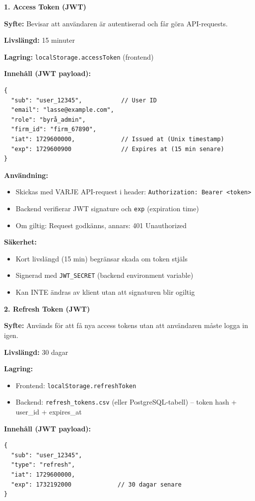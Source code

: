 \documentclass[12pt,a4paper]{article}
\begin{document}
\textbf{1. Access Token (JWT)}

\textbf{Syfte:} Bevisar att användaren är autentiserad och får göra API-requests.

\textbf{Livslängd:} 15 minuter

\textbf{Lagring:} \texttt{localStorage.accessToken} (frontend)

\textbf{Innehåll (JWT payload):}
\begin{verbatim}
{
  "sub": "user_12345",           // User ID
  "email": "lasse@example.com",
  "role": "byrå_admin",
  "firm_id": "firm_67890",
  "iat": 1729600000,             // Issued at (Unix timestamp)
  "exp": 1729600900              // Expires at (15 min senare)
}
\end{verbatim}

\textbf{Användning:}
\begin{itemize}[noitemsep]
  \item Skickas med VARJE API-request i header: \texttt{Authorization: Bearer <token>}
  \item Backend verifierar JWT signature och \texttt{exp} (expiration time)
  \item Om giltig: Request godkänns, annars: 401 Unauthorized
\end{itemize}

\textbf{Säkerhet:}
\begin{itemize}[noitemsep]
  \item Kort livslängd (15 min) begränsar skada om token stjäls
  \item Signerad med \texttt{JWT\_SECRET} (backend environment variable)
  \item Kan INTE ändras av klient utan att signaturen blir ogiltig
\end{itemize}

\textbf{2. Refresh Token (JWT)}

\textbf{Syfte:} Används för att få nya access tokens utan att användaren måste logga in igen.

\textbf{Livslängd:} 30 dagar

\textbf{Lagring:}
\begin{itemize}[noitemsep]
  \item Frontend: \texttt{localStorage.refreshToken}
  \item Backend: \texttt{refresh\_tokens.csv} (eller PostgreSQL-tabell) -- token hash + user\_id + expires\_at
\end{itemize}

\textbf{Innehåll (JWT payload):}
\begin{verbatim}
{
  "sub": "user_12345",
  "type": "refresh",
  "iat": 1729600000,
  "exp": 1732192000             // 30 dagar senare
}
\end{verbatim}
\end{document}
